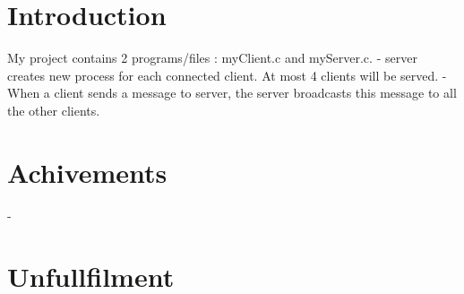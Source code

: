 

\maketitle

\section{Introduction}
My project contains 2 programs/files : myClient.c and myServer.c.
- server creates new process for each connected client. At most 4 clients will be served.
- When a client sends a message to server, the server broadcasts this message to all the other clients.

\section{Achivements}
- 

\section{Unfullfilment}


